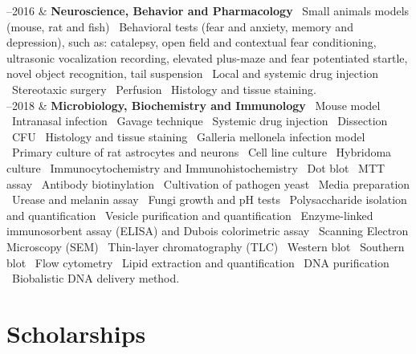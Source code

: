\documentclass[11pt, a4paper]{article}
\newcommand{\Duration}[2]{\fontsize{10pt}{0}\selectfont #1--#2}
\begin{document}
\begin{EntriesTable}

	\Duration{2010}{2016}  &
	\textbf{Neuroscience, Behavior and Pharmacology}
	\newline
	 \textbullet \ Small animals models (mouse, rat and fish)
	 \textbullet \ Behavioral tests (fear and anxiety, memory and depression),
	 such as: catalepsy, open field and contextual fear conditioning, ultrasonic
	 vocalization recording, elevated plus-maze and fear potentiated startle,
	 novel object recognition, tail suspension
	 \textbullet \ Local and systemic drug injection
	 \textbullet \ Stereotaxic surgery
	 \textbullet \ Perfusion
	 \textbullet \ Histology and tissue staining.
	\\

	\Duration{2014}{2018}  &
	\textbf{Microbiology, Biochemistry and Immunology}
	\newline
	\textbullet \ Mouse model
	\textbullet \ Intranasal infection
	\textbullet \ Gavage technique
	\textbullet \ Systemic drug injection
	\textbullet \ Dissection
	\textbullet \ CFU
	\textbullet \ Histology and tissue staining
	\textbullet \ Galleria mellonela infection model
	\textbullet \ Primary culture of rat astrocytes and neurons
	\textbullet \ Cell line culture
	\textbullet \ Hybridoma culture
	\textbullet \ Immunocytochemistry and Immunohistochemistry
	\textbullet \ Dot blot
	\textbullet \ MTT assay
	\textbullet \ Antibody biotinylation
	\textbullet \ Cultivation of pathogen yeast
	\textbullet \ Media preparation
	\textbullet \ Urease and melanin assay
	\textbullet \ Fungi growth and pH tests
	\textbullet \ Polysaccharide isolation and quantification
	\textbullet \ Vesicle purification and quantification
	\textbullet \ Enzyme-linked immunosorbent assay (ELISA) and Dubois
	colorimetric assay
	\textbullet \ Scanning Electron Microscopy (SEM)
	\textbullet \ Thin-layer chromatography (TLC)
	\textbullet \ Western blot
	\textbullet \ Southern blot
	\textbullet \ Flow cytometry
	\textbullet \ Lipid extraction and quantification
	\textbullet \ DNA purification
	\textbullet \ Biobalistic DNA delivery method.
	\\


\end{EntriesTable}


\section*{Scholarships}
\end{document}
